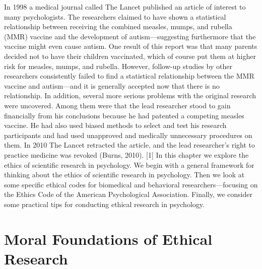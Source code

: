 

In 1998 a medical journal called The Lancet published an article of interest to many psychologists. The researchers claimed to have shown a statistical relationship between receiving the combined measles, mumps, and rubella (MMR) vaccine and the development of autism---suggesting furthermore that the vaccine might even cause autism. One result of this report was that many parents decided not to have their children vaccinated, which of course put them at higher risk for measles, mumps, and rubella. However, follow-up studies by other researchers consistently failed to find a statistical relationship between the MMR vaccine and autism---and it is generally accepted now that there is no relationship. In addition, several more serious problems with the original research were uncovered. Among them were that the lead researcher stood to gain financially from his conclusions because he had patented a competing measles vaccine. He had also used biased methods to select and test his research participants and had used unapproved and medically unnecessary procedures on them. In 2010 The Lancet retracted the article, and the lead researcher's right to practice medicine was revoked (Burns, 2010). [1]
In this chapter we explore the ethics of scientific research in psychology. We begin with a general framework for thinking about the ethics of scientific research in psychology. Then we look at some specific ethical codes for biomedical and behavioral researchers---focusing on the Ethics Code of the American Psychological Association. Finally, we consider some practical tips for conducting ethical research in psychology.

\section{Moral Foundations of Ethical Research}


